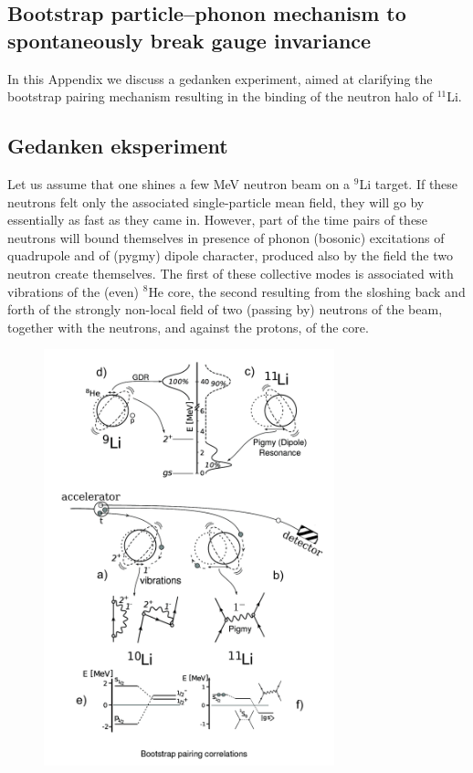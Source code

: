 \begin{subappendices}
\section[Bootstrap mechanism to break gauge invariance]{Bootstrap particle--phonon mechanism to spontaneously break gauge invariance}\label{C8AppA}
In this Appendix we discuss a gedanken experiment, aimed at clarifying the bootstrap pairing mechanism resulting in the binding of the neutron halo of $^{11}$Li. 
\subsection{Gedanken eksperiment}
Let us assume that one shines a  few MeV neutron beam on a $^{9}$Li target. If these neutrons felt only the associated single-particle mean field, they will go by essentially as fast as they came in.  However,  part of the time pairs of these neutrons will bound themselves in  presence of phonon (bosonic) excitations of quadrupole and of (pygmy) dipole character, produced also by the field the two neutron create themselves. The first of these collective modes is  associated with vibrations of the (even) $^{8}$He core, the second resulting from the sloshing back and forth of the strongly non-local field of two (passing by) neutrons of the beam, together with the neutrons, and against the protons, of the core.
\begin{figure}[h!]
	\begin{center}
		\includegraphics[width=0.75\textwidth]{C8/figsC8/BootStrap_Li}

\end{center}
\end{figure}
\end{subappendices}
